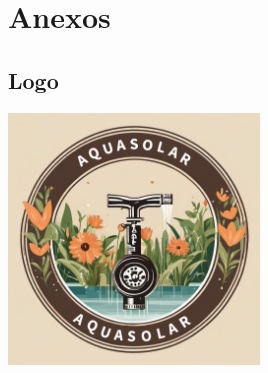 \documentclass[12pt]{article}
\begin{document}
\section{Anexos}

\subsection{Logo}
\begin{center}
      \includegraphics[width=0.5\textwidth]{imagenes/logo.png}
\end{center}
\end{document}
